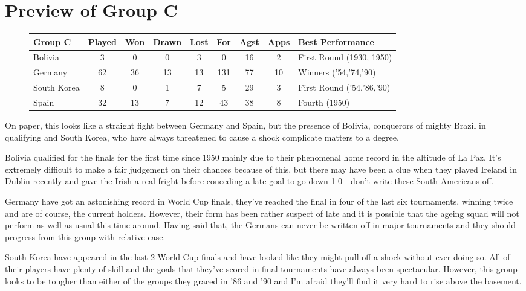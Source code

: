 \chapter{Preview of Group C}
\newline
\newline
\begin{figure}[H]
\small
\begin{tabular}{l c c c c c c c l}
Group C & Played & Won & Drawn & Lost & For & Agst & Apps & Best Performance\\ \hline
Bolivia & 3 & 0 & 0 & 3 & 0 & 16 & 2 & First Round (1930, 1950) \\
Germany & 62 & 36 & 13 & 13 & 131 & 77 & 10 & Winners ('54,'74,'90) \\
South Korea & 8 & 0 & 1 & 7 & 5 & 29 & 3 & First Round ('54,'86,'90) \\
Spain & 32 & 13 & 7 & 12 & 43 & 38 & 8 & Fourth (1950) \\ \hline
\end{tabular}
\normalsize
\end{figure}
On paper, this looks like a straight fight between Germany and Spain, but the
presence of Bolivia, conquerors of mighty Brazil in qualifying and South Korea,
who have always threatened to cause a shock complicate matters to a degree.

Bolivia qualified for the finals for the first time since 1950 mainly due to 
their phenomenal home record in the altitude of La Paz. It's extremely
difficult to make a fair judgement on their chances because of this, but there
may have been a clue when they played Ireland in Dublin recently and gave the
Irish a real fright before conceding a late goal to go down 1-0 - don't write
these South Americans off.

Germany have got an astonishing record in World Cup finals, they've reached the
final in four of the last six tournaments, winning twice and are of course, the
current holders. However, their form has been rather suspect of late and it is
possible that the ageing squad will not perform as well as usual this time 
around. Having said that, the Germans can never be written off in major
tournaments and they should progress from this group with relative ease.

South Korea have appeared in the last 2 World Cup finals and have looked like
they might pull off a shock without ever doing so. All of their players have 
plenty of skill and the goals that they've scored in final tournaments have
always been spectacular. However, this group looks to be tougher than either
of the groups they graced in '86 and '90 and I'm afraid they'll find it very
hard to rise above the basement.

